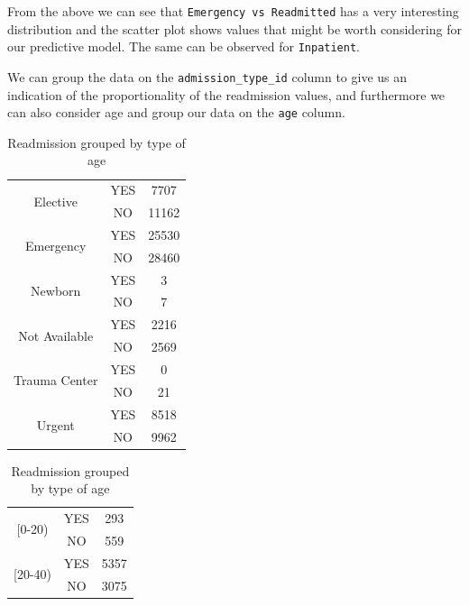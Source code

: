 \documentclass[11pt]{report}
\newcommand{\linespace}{\vspace{0.3cm}\noindent}
\begin{document}
\noindent
From the above we can see that \texttt{Emergency vs Readmitted} has a very interesting distribution and the scatter plot shows values that might be worth considering for our predictive model. The same can be observed for \texttt{Inpatient}.

\linespace
We can group the data on the \texttt{admission\_type\_id} column to give us an indication of the proportionality of the readmission values, and furthermore we can also consider age and group our data on the \texttt{age} column. 

\begin{table}[!ht]
    \begin{minipage}[t]{.5\linewidth}
      \caption{Readmission grouped by type of admission}
      \centering
        \begin{tabular}{|c|c|c|}
\hline
\multirow{2}{*}{Elective}      & YES & 7707  \\ 
                               & NO  & 11162 \\ \hline
\multirow{2}{*}{Emergency}     & YES & 25530 \\
                               & NO  & 28460 \\ \hline 
\multirow{2}{*}{Newborn}       & YES & 3     \\
                               & NO  & 7     \\ \hline
\multirow{2}{*}{Not Available} & YES & 2216  \\
                               & NO  & 2569  \\ \hline 
\multirow{2}{*}{Trauma Center} & YES & 0     \\
                               & NO  & 21    \\ \hline
\multirow{2}{*}{Urgent}        & YES & 8518  \\
                               & NO  & 9962  \\ \hline
\end{tabular}
    \end{minipage}%
    \begin{minipage}[t]{.5\linewidth}
      \centering
        \caption{Readmission grouped by type of age}
        \begin{tabular}{|c|c|c|}
\hline
\multirow{2}{*}{[0-20)}        & YES & 293   \\
                               & NO  & 559   \\ \hline 
\multirow{2}{*}{[20-40)}       & YES & 5357 \\
                               & NO  & 3075   \\ \hline

\end{tabular}
\end{minipage}
\end{table}
\end{document}
